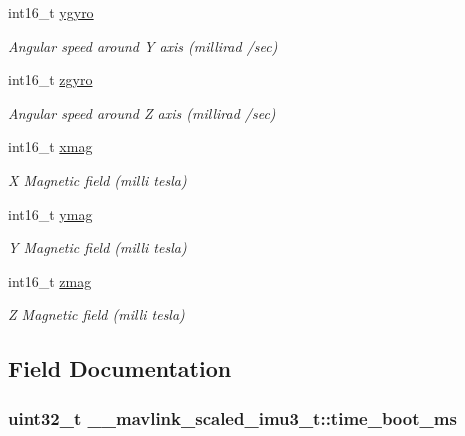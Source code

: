 \begin{DoxyCompactItemize}
int16\+\_\+t \hyperlink{struct____mavlink__scaled__imu3__t_a5a3a285ac25b5267987d314890a4c5b1}{ygyro}
\begin{DoxyCompactList}\small\item\em Angular speed around Y axis (millirad /sec) \end{DoxyCompactList}\item 
int16\+\_\+t \hyperlink{struct____mavlink__scaled__imu3__t_a67cb6428c59de4b6e5ba0401d5cd8993}{zgyro}
\begin{DoxyCompactList}\small\item\em Angular speed around Z axis (millirad /sec) \end{DoxyCompactList}\item 
int16\+\_\+t \hyperlink{struct____mavlink__scaled__imu3__t_a08d29d8a6663027546efcf60cd8203aa}{xmag}
\begin{DoxyCompactList}\small\item\em X Magnetic field (milli tesla) \end{DoxyCompactList}\item 
int16\+\_\+t \hyperlink{struct____mavlink__scaled__imu3__t_a805f83b854058bc1cabd0bf2ca616795}{ymag}
\begin{DoxyCompactList}\small\item\em Y Magnetic field (milli tesla) \end{DoxyCompactList}\item 
int16\+\_\+t \hyperlink{struct____mavlink__scaled__imu3__t_a478b7a4a81b84f588694fa30db3ee9a0}{zmag}
\begin{DoxyCompactList}\small\item\em Z Magnetic field (milli tesla) \end{DoxyCompactList}\end{DoxyCompactItemize}


\subsection{Field Documentation}
\hypertarget{struct____mavlink__scaled__imu3__t_a3b9ed7ae79c67d82b3d38b2b12d09388}{
\subsubsection[{time\+\_\+boot\+\_\+ms}]{\setlength{\rightskip}{0pt plus 5cm}uint32\+\_\+t \+\_\+\+\_\+mavlink\+\_\+scaled\+\_\+imu3\+\_\+t\+::time\+\_\+boot\+\_\+ms}}\label{struct____mavlink__scaled__imu3__t_a3b9ed7ae79c67d82b3d38b2b12d09388}


